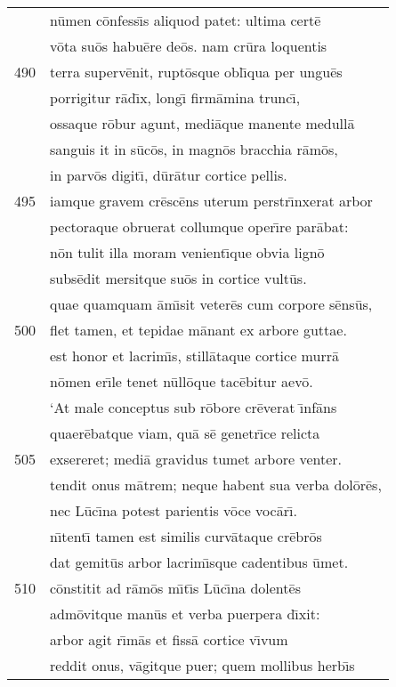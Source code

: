 \documentclass[paper=6in:9in,pagesize=pdftex,
               headinclude=on,footinclude=on,12pt]{scrbook}
\begin{document}
\begin{longtable}[p]{ r l }
 & n\=umen c\=onfess\={\i}s aliquod patet: ultima cert\=e\\ 
 & v\=ota su\=os habu\=ere de\=os. nam cr\=ura loquentis\\ 
490 & terra superv\=enit, rupt\=osque obl\={\i}qua per ungu\=es\\ 
 & porrigitur r\=ad\={\i}x, long\={\i} firm\=amina trunc\={\i},\\ 
 & ossaque r\=obur agunt, medi\=aque manente medull\=a\\ 
 & sanguis it in s\=uc\=os, in magn\=os bracchia r\=am\=os,\\ 
 & in parv\=os digit\={\i}, d\=ur\=atur cortice pellis.\\ 
495 & iamque gravem cr\=esc\=ens uterum perstr\={\i}nxerat arbor\\ 
 & pectoraque obruerat collumque oper\={\i}re par\=abat:\\ 
 & n\=on tulit illa moram venient\={\i}que obvia lign\=o\\ 
 & subs\=edit mersitque su\=os in cortice vult\=us.\\ 
 & quae quamquam \=am\={\i}sit veter\=es cum corpore s\=ens\=us,\\ 
500 & flet tamen, et tepidae m\=anant ex arbore guttae.\\ 
 & est honor et lacrim\={\i}s, still\=ataque cortice murr\=a\\ 
 & n\=omen er\={\i}le tenet n\=ull\=oque tac\=ebitur aev\=o.\\ 
 & \indent `At male conceptus sub r\=obore cr\=everat \={\i}nf\=ans\\ 
 & quaer\=ebatque viam, qu\=a s\=e genetr\={\i}ce relicta\\ 
505 & exsereret; medi\=a gravidus tumet arbore venter.\\ 
 & tendit onus m\=atrem; neque habent sua verba dol\=or\=es,\\ 
 & nec L\=uc\={\i}na potest parientis v\=oce voc\=ar\={\i}.\\ 
 & n\={\i}tent\={\i} tamen est similis curv\=ataque cr\=ebr\=os\\ 
 & dat gemit\=us arbor lacrim\={\i}sque cadentibus \=umet.\\ 
510 & c\=onstitit ad r\=am\=os m\={\i}t\={\i}s L\=uc\={\i}na dolent\=es\\ 
 & adm\=ovitque man\=us et verba puerpera d\={\i}xit:\\ 
 & arbor agit r\={\i}m\=as et fiss\=a cortice v\={\i}vum\\ 
 & reddit onus, v\=agitque puer; quem mollibus herb\={\i}s\\ 

\end{longtable}
\end{document}
